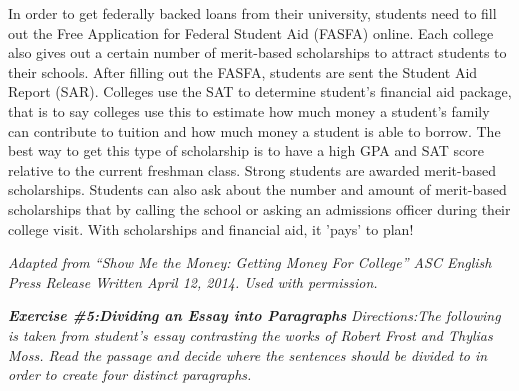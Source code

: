 \documentclass[12pt]{book}
\renewcommand{\indent}{\hspace{1cm}}
\begin{document}
\begin{spacing}{2}
\begin{linenumbers*}
\indent In order to get federally backed loans from their university, students need to fill out the Free Application for Federal Student Aid (FASFA) online. Each college also gives out a certain number of merit-based scholarships to attract students to their schools. After filling out the FASFA, students are sent the Student Aid Report (SAR).  Colleges use the SAT to determine student's financial aid package, that is to say colleges use this to estimate how much money a student's family can contribute to tuition and how much money a student is able to borrow. The best way to get this type of scholarship is to have a high GPA and SAT score relative to the current freshman class. Strong students are awarded merit-based scholarships. Students can also ask about the number and amount of merit-based scholarships that by calling the school or asking an admissions officer during their college visit. With scholarships and financial aid, it 'pays' to plan!
\end{linenumbers*}
\end{spacing}

\textit{Adapted from “Show Me the Money: Getting Money For College” ASC English Press Release Written April 12, 2014. Used with permission.} 


\bigskip
\textbf\textit{Exercise \#5:Dividing an Essay into Paragraphs}
\bigskip
\textit{Directions:The following is taken from student's essay contrasting the works of Robert Frost and Thylias Moss. Read the passage and decide where the sentences should be divided to in order to create four distinct paragraphs. }
\end{document}
